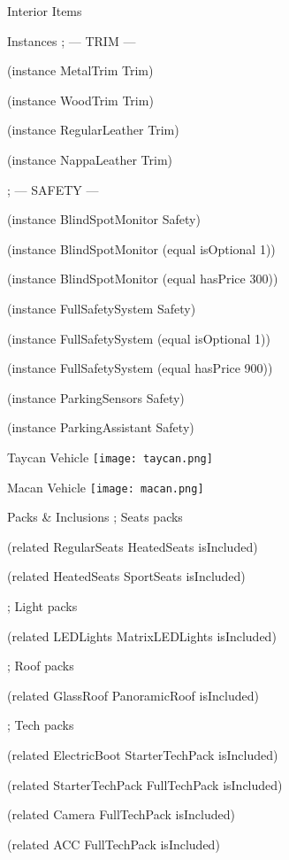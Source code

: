 \documentclass{beamer}
\begin{document}
\begin{frame}{Interior Items}
\begin{block}{Instances}
; --- TRIM ---

(instance MetalTrim Trim)

(instance WoodTrim Trim)

(instance RegularLeather Trim)

(instance NappaLeather Trim)

; --- SAFETY ---

(instance BlindSpotMonitor Safety)

(instance BlindSpotMonitor (equal isOptional 1))

(instance BlindSpotMonitor (equal hasPrice 300))

(instance FullSafetySystem Safety)

(instance FullSafetySystem (equal isOptional 1))

(instance FullSafetySystem (equal hasPrice 900))

(instance ParkingSensors Safety)

(instance ParkingAssistant Safety)
\end{block}
\end{frame}

\begin{frame}{Taycan Vehicle}
    \texttt{[image: taycan.png]}
\end{frame}

\begin{frame}{Macan Vehicle}
    \texttt{[image: macan.png]}
\end{frame}

\begin{frame}{Packs \& Inclusions}
; Seats packs
    
(related RegularSeats HeatedSeats isIncluded)

(related HeatedSeats SportSeats isIncluded)

; Light packs

(related LEDLights MatrixLEDLights isIncluded)

; Roof packs

(related GlassRoof PanoramicRoof isIncluded)

; Tech packs

(related ElectricBoot StarterTechPack isIncluded)

(related StarterTechPack FullTechPack isIncluded)

(related Camera FullTechPack isIncluded)

(related ACC FullTechPack isIncluded)
\end{frame}
\end{document}
